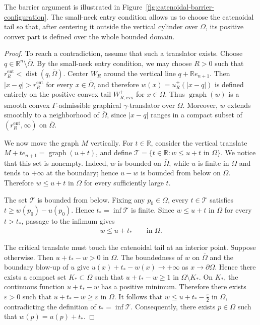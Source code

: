 \documentclass{amsart}
\theoremstyle{plain}
\theoremstyle{mainintrothm}
\theoremstyle{definition}
\begin{document}
The barrier argument is illustrated in
Figure~\ref{fig:catenoidal-barrier-configuration}.  The small-neck entry
condition allows us to choose the catenoidal tail so that, after centering it
outside the vertical cylinder over $\Omega$, its positive convex part is defined
over the whole bounded domain.



\begin{proof}
	To reach a contradiction, assume that such a translator exists.  Choose
	$q\in\mathbb R^n\setminus\overline\Omega$.  By the small-neck entry
	condition, we may choose $R>0$ such that
	$r_R^{\mathrm{ent}}<\operatorname{dist}(q,\overline\Omega)$.  Center $W_R$
	around the vertical line $q+\mathbb R e_{n+1}$.  Then
	$|x-q|>r_R^{\mathrm{ent}}$ for every $x\in\overline\Omega$, and therefore
	$w(x)=u_R^+(|x-q|)$ is defined entirely on the positive convex tail
	$W_{R,\mathrm{cvx}}^+$ for $x\in\Omega$.  Thus $\operatorname{graph}(w)$ is a
	smooth convex $\Gamma$-admissible graphical $\gamma$-translator over
	$\Omega$.  Moreover, $w$ extends smoothly to a neighborhood of
	$\overline\Omega$, since $|x-q|$ ranges in a compact subset of
	$(r_R^{\mathrm{ent}},\infty)$ on $\overline\Omega$.
	
	\medskip
	
	We now move the graph $M$ vertically.  For $t\in\mathbb R$, consider the
	vertical translate $M+t e_{n+1}=\operatorname{graph}(u+t)$, and define $\mathcal T=\{t\in\mathbb R:w\le u+t\text{ in }\Omega\}$. We notice that this set is nonempty.  Indeed, $w$ is bounded on $\overline\Omega$, while
	$u$ is finite in $\Omega$ and tends to $+\infty$ at the boundary; hence
	$u-w$ is bounded from below on $\Omega$.  Therefore $w\le u+t$ in $\Omega$
	for every sufficiently large $t$.
	
	\medskip
	
	The set $\mathcal T$ is bounded from below.  Fixing any $p_0\in\Omega$, every
	$t\in\mathcal T$ satisfies $t\ge w(p_0)-u(p_0)$.  Hence
	$t_*=\inf\mathcal T$ is finite.  Since $w\le u+t$ in $\Omega$ for every
	$t>t_*$, passage to the infimum gives
	\begin{align}
		\label{eq:critical-barrier-order}
		w\le u+t_*
		\qquad
		\text{in }\Omega .
	\end{align}
		
	The critical translate must touch the catenoidal tail at an interior point.
	Suppose otherwise.  Then $u+t_*-w>0$ in $\Omega$.  The boundedness of $w$ on
	$\overline\Omega$ and the boundary blow-up of $u$ give
	$u(x)+t_*-w(x)\to+\infty$ as $x\to\partial\Omega$.  Hence there exists a
	compact set $K_*\subset\Omega$ such that $u+t_*-w\ge1$ in
	$\Omega\setminus K_*$.  On $K_*$, the continuous function $u+t_*-w$ has a
	positive minimum.  Therefore there exists $\varepsilon>0$ such that
	$u+t_*-w\ge\varepsilon$ in $\Omega$.  It follows that
	$w\le u+t_*-\frac{\varepsilon}{2}$ in $\Omega$, contradicting the definition
	of $t_*=\inf\mathcal T$.  Consequently, there exists $p\in\Omega$ such that
	$w(p)=u(p)+t_*$.
	

\end{proof}
\end{document}
